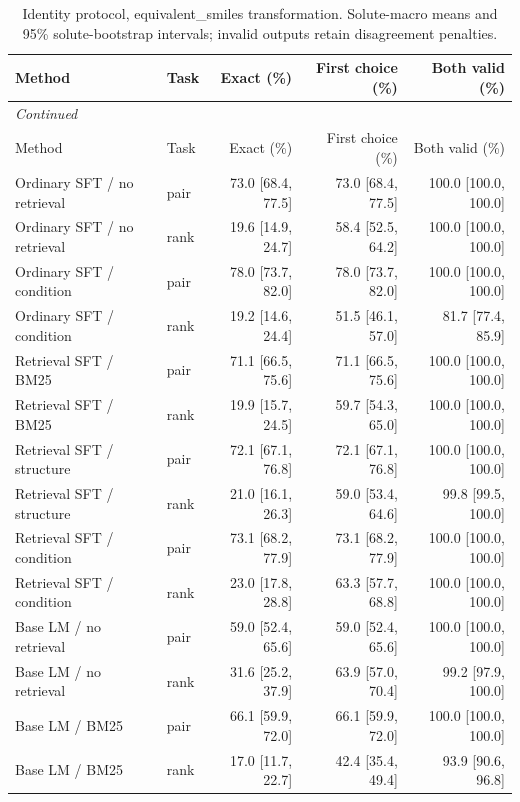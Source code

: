 \begingroup\footnotesize
\setlength{\tabcolsep}{3pt}
\begin{longtable}{p{.26\linewidth}lrrr}
\caption{Identity protocol, equivalent\_smiles transformation. Solute-macro means and 95\% solute-bootstrap intervals; invalid outputs retain disagreement penalties.}\label{tab:consistency-identity-equivalent-smiles}\\
\toprule
Method & Task & Exact (\%) & First choice (\%) & Both valid (\%) \\
\midrule
\endfirsthead
\multicolumn{5}{l}{\textit{Continued}} \\
\toprule
Method & Task & Exact (\%) & First choice (\%) & Both valid (\%) \\
\midrule
\endhead
Ordinary SFT / no retrieval & pair & 73.0 [68.4, 77.5] & 73.0 [68.4, 77.5] & 100.0 [100.0, 100.0] \\
Ordinary SFT / no retrieval & rank & 19.6 [14.9, 24.7] & 58.4 [52.5, 64.2] & 100.0 [100.0, 100.0] \\
Ordinary SFT / condition & pair & 78.0 [73.7, 82.0] & 78.0 [73.7, 82.0] & 100.0 [100.0, 100.0] \\
Ordinary SFT / condition & rank & 19.2 [14.6, 24.4] & 51.5 [46.1, 57.0] & 81.7 [77.4, 85.9] \\
Retrieval SFT / BM25 & pair & 71.1 [66.5, 75.6] & 71.1 [66.5, 75.6] & 100.0 [100.0, 100.0] \\
Retrieval SFT / BM25 & rank & 19.9 [15.7, 24.5] & 59.7 [54.3, 65.0] & 100.0 [100.0, 100.0] \\
Retrieval SFT / structure & pair & 72.1 [67.1, 76.8] & 72.1 [67.1, 76.8] & 100.0 [100.0, 100.0] \\
Retrieval SFT / structure & rank & 21.0 [16.1, 26.3] & 59.0 [53.4, 64.6] & 99.8 [99.5, 100.0] \\
Retrieval SFT / condition & pair & 73.1 [68.2, 77.9] & 73.1 [68.2, 77.9] & 100.0 [100.0, 100.0] \\
Retrieval SFT / condition & rank & 23.0 [17.8, 28.8] & 63.3 [57.7, 68.8] & 100.0 [100.0, 100.0] \\
Base LM / no retrieval & pair & 59.0 [52.4, 65.6] & 59.0 [52.4, 65.6] & 100.0 [100.0, 100.0] \\
Base LM / no retrieval & rank & 31.6 [25.2, 37.9] & 63.9 [57.0, 70.4] & 99.2 [97.9, 100.0] \\
Base LM / BM25 & pair & 66.1 [59.9, 72.0] & 66.1 [59.9, 72.0] & 100.0 [100.0, 100.0] \\
Base LM / BM25 & rank & 17.0 [11.7, 22.7] & 42.4 [35.4, 49.4] & 93.9 [90.6, 96.8] \\

\end{longtable}
